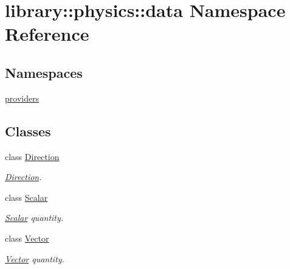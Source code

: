\hypertarget{namespacelibrary_1_1physics_1_1data}{}\section{library\+:\+:physics\+:\+:data Namespace Reference}
\label{namespacelibrary_1_1physics_1_1data}
\subsection*{Namespaces}
\begin{DoxyCompactItemize}
\item 
 \hyperlink{namespacelibrary_1_1physics_1_1data_1_1providers}{providers}
\end{DoxyCompactItemize}
\subsection*{Classes}
\begin{DoxyCompactItemize}
\item 
class \hyperlink{classlibrary_1_1physics_1_1data_1_1_direction}{Direction}
\begin{DoxyCompactList}\small\item\em \hyperlink{classlibrary_1_1physics_1_1data_1_1_direction}{Direction}. \end{DoxyCompactList}\item 
class \hyperlink{classlibrary_1_1physics_1_1data_1_1_scalar}{Scalar}
\begin{DoxyCompactList}\small\item\em \hyperlink{classlibrary_1_1physics_1_1data_1_1_scalar}{Scalar} quantity. \end{DoxyCompactList}\item 
class \hyperlink{classlibrary_1_1physics_1_1data_1_1_vector}{Vector}
\begin{DoxyCompactList}\small\item\em \hyperlink{classlibrary_1_1physics_1_1data_1_1_vector}{Vector} quantity. \end{DoxyCompactList}\end{DoxyCompactItemize}
